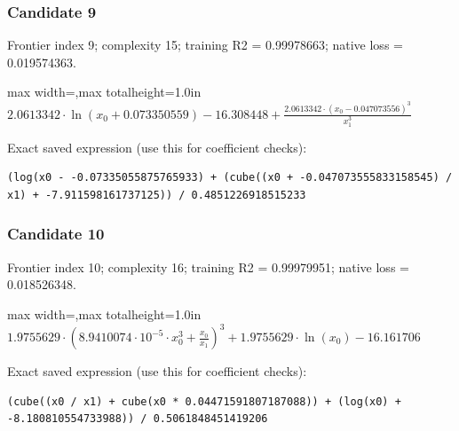 \documentclass[10pt,letterpaper,landscape]{article}
\begin{document}
\subsubsection*{Candidate 9}
Frontier index 9; complexity 15; training R2 = 0.99978663; native loss = 0.019574363.
\begin{center}\begin{adjustbox}{max width=\linewidth,max totalheight=1.0in}$\displaystyle 2.0613342 \cdot \ln{\left(x_{0} + 0.073350559 \right)} - 16.308448 + \frac{2.0613342 \cdot \left(x_{0} - 0.047073556\right)^{3}}{x_{1}^{3}}$\end{adjustbox}\end{center}
{\scriptsize Exact saved expression (use this for coefficient checks):}
\begin{lstlisting}
(log(x0 - -0.07335055875765933) + (cube((x0 + -0.047073555833158545) / x1) + -7.911598161737125)) / 0.4851226918515233
\end{lstlisting}
\subsubsection*{Candidate 10}
Frontier index 10; complexity 16; training R2 = 0.99979951; native loss = 0.018526348.
\begin{center}\begin{adjustbox}{max width=\linewidth,max totalheight=1.0in}$\displaystyle 1.9755629 \cdot \left(8.9410074 \cdot 10^{-5} \cdot x_{0}^{3} + \frac{x_{0}}{x_{1}}\right)^{3} + 1.9755629 \cdot \ln{\left(x_{0} \right)} - 16.161706$\end{adjustbox}\end{center}
{\scriptsize Exact saved expression (use this for coefficient checks):}
\begin{lstlisting}
(cube((x0 / x1) + cube(x0 * 0.04471591807187088)) + (log(x0) + -8.180810554733988)) / 0.5061848451419206
\end{lstlisting}
\end{document}
